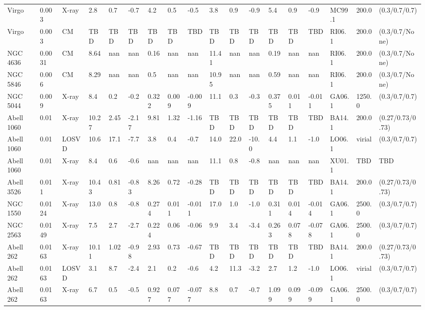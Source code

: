 \documentclass{article}
\begin{document}
\begin{center}
\begin{landscape}
\begin{longtable}{llllllllllllllllll}
\\[-1.8ex] \hline 
\endlastfoot

Virgo & 0.003 & X-ray & 2.8 & 0.7 & -0.7 & 4.2 & 0.5 & -0.5 & 3.8 & 0.9 & -0.9 & 5.4 & 0.9 & -0.9 & MC99.1 & 200.0 & (0.3/0.7/0.7) \\
Virgo & 0.003 & CM & TBD & TBD & TBD & TBD & TBD & TBD & TBD & TBD & TBD & TBD & TBD & TBD & RI06.1 & 200.0 & (0.3/0.7/None) \\
NGC 4636 & 0.0031 & CM & 8.64 & nan & nan & 0.16 & nan & nan & 11.41 & nan & nan & 0.19 & nan & nan & RI06.1 & 200.0 & (0.3/0.7/None) \\
NGC 5846 & 0.006 & CM & 8.29 & nan & nan & 0.5 & nan & nan & 10.95 & nan & nan & 0.59 & nan & nan & RI06.1 & 200.0 & (0.3/0.7/None) \\
NGC 5044 & 0.009 & X-ray & 8.4 & 0.2 & -0.2 & 0.322 & 0.009 & -0.009 & 11.1 & 0.3 & -0.3 & 0.375 & 0.011 & -0.011 & GA06.1 & 1250.0 & (0.3/0.7/0.7) \\
Abell 1060 & 0.01 & X-ray & 10.27 & 2.45 & -2.17 & 9.81 & 1.32 & -1.16 & TBD & TBD & TBD & TBD & TBD & TBD & BA14.1 & 200.0 & (0.27/0.73/0.73) \\
Abell 1060 & 0.01 & LOSVD & 10.6 & 17.1 & -7.7 & 3.8 & 0.4 & -0.7 & 14.0 & 22.0 & -10.0 & 4.4 & 1.1 & -1.0 & LO06.1 & virial & (0.3/0.7/0.7) \\
Abell 1060 & 0.01 & X-ray & 8.4 & 0.6 & -0.6 & nan & nan & nan & 11.1 & 0.8 & -0.8 & nan & nan & nan & XU01.1 & TBD & TBD \\
Abell 3526 & 0.011 & X-ray & 10.43 & 0.81 & -0.83 & 8.26 & 0.72 & -0.28 & TBD & TBD & TBD & TBD & TBD & TBD & BA14.1 & 200.0 & (0.27/0.73/0.73) \\
NGC 1550 & 0.0124 & X-ray & 13.0 & 0.8 & -0.8 & 0.274 & 0.011 & -0.011 & 17.0 & 1.0 & -1.0 & 0.311 & 0.014 & -0.014 & GA06.1 & 2500.0 & (0.3/0.7/0.7) \\
NGC 2563 & 0.0149 & X-ray & 7.5 & 2.7 & -2.7 & 0.224 & 0.06 & -0.06 & 9.9 & 3.4 & -3.4 & 0.263 & 0.078 & -0.078 & GA06.1 & 2500.0 & (0.3/0.7/0.7) \\
Abell 262 & 0.0163 & X-ray & 10.11 & 1.02 & -0.98 & 2.93 & 0.73 & -0.67 & TBD & TBD & TBD & TBD & TBD & TBD & BA14.1 & 200.0 & (0.27/0.73/0.73) \\
Abell 262 & 0.0163 & LOSVD & 3.1 & 8.7 & -2.4 & 2.1 & 0.2 & -0.6 & 4.2 & 11.3 & -3.2 & 2.7 & 1.2 & -1.0 & LO06.1 & virial & (0.3/0.7/0.7) \\
Abell 262 & 0.0163 & X-ray & 6.7 & 0.5 & -0.5 & 0.927 & 0.077 & -0.077 & 8.8 & 0.7 & -0.7 & 1.099 & 0.099 & -0.099 & GA06.1 & 2500.0 & (0.3/0.7/0.7) \\

\end{longtable}
\end{landscape}
\end{center}
\end{document}
